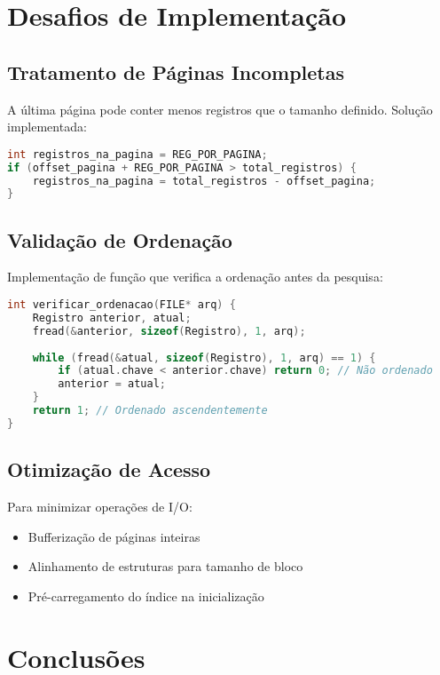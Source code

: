 \documentclass[12pt,a4paper,brazil]{article}
\begin{document}
\section{Desafios de Implementação}

\subsection{Tratamento de Páginas Incompletas}
A última página pode conter menos registros que o tamanho definido. Solução implementada:

\begin{lstlisting}[language=C]
int registros_na_pagina = REG_POR_PAGINA;
if (offset_pagina + REG_POR_PAGINA > total_registros) {
    registros_na_pagina = total_registros - offset_pagina;
}
\end{lstlisting}

\subsection{Validação de Ordenação}
Implementação de função que verifica a ordenação antes da pesquisa:

\begin{lstlisting}[language=C]
int verificar_ordenacao(FILE* arq) {
    Registro anterior, atual;
    fread(&anterior, sizeof(Registro), 1, arq);
    
    while (fread(&atual, sizeof(Registro), 1, arq) == 1) {
        if (atual.chave < anterior.chave) return 0; // Não ordenado
        anterior = atual;
    }
    return 1; // Ordenado ascendentemente
}
\end{lstlisting}

\subsection{Otimização de Acesso}
Para minimizar operações de I/O:
\begin{itemize}
    \item Bufferização de páginas inteiras
    \item Alinhamento de estruturas para tamanho de bloco
    \item Pré-carregamento do índice na inicialização
\end{itemize}

\section{Conclusões}
\end{document}
